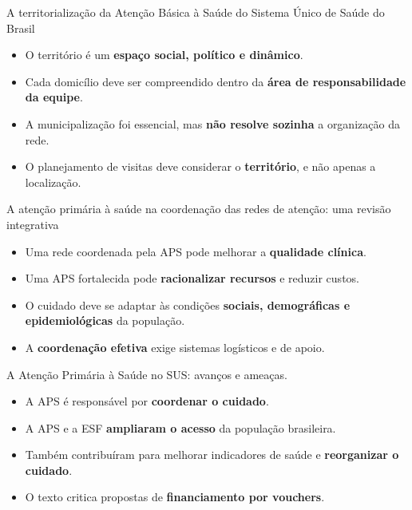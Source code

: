﻿\documentclass[aspectratio=169]{beamer}
\begin{document}
\begin{frame}{A territorialização da Atenção Básica à Saúde do Sistema Único de Saúde do Brasil}
  \begin{itemize}
    \item O território é um \textbf{espaço social, político e dinâmico}.
    \item Cada domicílio deve ser compreendido dentro da \textbf{área de responsabilidade da equipe}.
    \item A municipalização foi essencial, mas \textbf{não resolve sozinha} a organização da rede.
    \item O planejamento de visitas deve considerar o \textbf{território}, e não apenas a localização.
  \end{itemize}
\end{frame}

\begin{frame}{A atenção primária à saúde na  coordenação  das  redes  de  atenção:  uma  revisão integrativa}
  \begin{itemize}
    \item Uma rede coordenada pela APS pode melhorar a \textbf{qualidade clínica}.
    \item Uma APS fortalecida pode \textbf{racionalizar recursos} e reduzir custos.
    \item O cuidado deve se adaptar às condições \textbf{sociais, demográficas e epidemiológicas} da população.
    \item A \textbf{coordenação efetiva} exige sistemas logísticos e de apoio.
  \end{itemize}
\end{frame}

\begin{frame}{A Atenção Primária à Saúde no SUS: avanços e ameaças.}
  \begin{itemize}
    \item A APS é responsável por \textbf{coordenar o cuidado}.
    \item A APS e a ESF \textbf{ampliaram o acesso} da população brasileira.
    \item Também contribuíram para melhorar indicadores de saúde e \textbf{reorganizar o cuidado}.
    \item O texto critica propostas de \textbf{financiamento por vouchers}.
  \end{itemize}
\end{frame}
\end{document}

